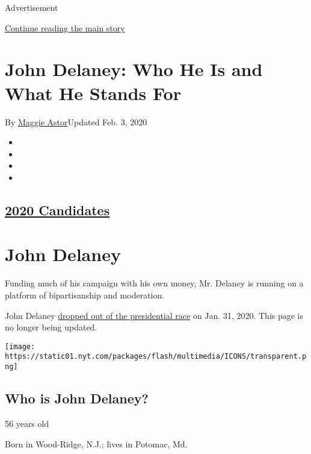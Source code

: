 Advertisement

\protect\hyperlink{after-top}{Continue reading the main story}

\hypertarget{john-delaney-who-he-is-and-what-he-stands-for}{%
\section{John Delaney: Who He Is and What He Stands
For}\label{john-delaney-who-he-is-and-what-he-stands-for}}

By \href{https://www.nytimes.com/by/maggie-astor}{Maggie Astor}Updated
Feb. 3, 2020

\begin{itemize}
\item
\item
\item
\item
\end{itemize}

\hypertarget{2020-candidates}{%
\subsection{\texorpdfstring{\href{https://www.nytimes.com/interactive/2019/us/politics/2020-presidential-candidates.html}{2020
Candidates}}{2020 Candidates}}\label{2020-candidates}}

\hypertarget{john-delaney}{%
\section{John Delaney}\label{john-delaney}}

Funding much of his campaign with his own money, Mr. Delaney is running
on a platform of bipartisanship and moderation.

John Delaney
\href{https://www.nytimes.com/2020/01/31/us/politics/john-delaney-drops-out.html}{dropped
out of the presidential race} on Jan. 31, 2020. This page is no longer
being updated.

\texttt{[image: https://static01.nyt.com/packages/flash/multimedia/ICONS/transparent.png]}

\hypertarget{who-is-john-delaney}{%
\subsection{Who is John Delaney?}\label{who-is-john-delaney}}

56 years old

Born in Wood-Ridge, N.J.; lives in Potomac, Md.

